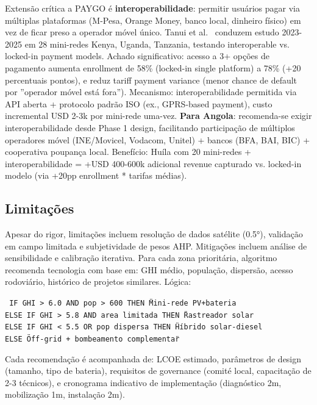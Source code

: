\documentclass[12pt, a4paper]{article}
\begin{document}
Extensão crítica a PAYGO é
\textbf{interoperabilidade}: permitir usuários pagar via múltiplas plataformas (M-Pesa, Orange Money, banco local, dinheiro físico) em vez de ficar preso a operador móvel único. Tanui et al.~\citep{Tanui2024} conduzem estudo 2023-2025 em 28 mini-redes Kenya, Uganda, Tanzania, testando interoperable vs. locked-in payment models. Achado significativo: acesso a 3+ opções de pagamento aumenta enrollment de 58\% (locked-in single platform) a 78\% (+20 percentuais pontos), e reduz tariff payment variance (menor chance de default por ''operador móvel está fora''). Mecanismo: interoperabilidade permitida via API aberta + protocolo padrão ISO (ex., GPRS-based payment), custo incremental USD 2-3k por mini-rede uma-vez. 
\textbf{Para Angola}: recomenda-se exigir interoperabilidade desde Phase 1 design, facilitando participação de múltiplos operadores móvel (INE/Movicel, Vodacom, Unitel) + bancos (BFA, BAI, BIC) + cooperativa poupança local. Benefício: Huíla com 20 mini-redes + interoperabilidade = +USD 400-600k adicional revenue capturado vs. locked-in modelo (via +20pp enrollment * tarifas médias).

\subsection{Limitações}

Apesar do rigor, limitações incluem resolução de dados satélite (0.5°), validação em campo limitada e subjetividade de pesos AHP. Mitigações incluem análise de sensibilidade e calibração iterativa.
Para cada zona prioritária, algoritmo recomenda tecnologia com base em: GHI médio, população, dispersão, acesso rodoviário, histórico de projetos similares. Lógica:

\texttt{
IF GHI > 6.0 AND pop > 600 THEN \"Mini-rede PV+bateria\" \\
ELSE IF GHI > 5.8 AND area limitada THEN \"Rastreador solar\" \\
ELSE IF GHI < 5.5 OR pop dispersa THEN \"Híbrido solar-diesel\" \\
ELSE \"Off-grid + bombeamento complementar\"
}

Cada recomendação é acompanhada de: LCOE estimado, parâmetros de design (tamanho, tipo de bateria), requisitos de governance (comité local, capacitação de 2-3 técnicos), e cronograma indicativo de implementação (diagnóstico 2m, mobilização 1m, instalação 2m).


\end{document}
